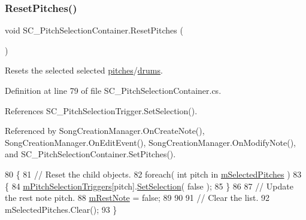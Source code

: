 \subsubsection{\texorpdfstring{Reset\+Pitches()}{ResetPitches()}}
{\footnotesize\ttfamily void S\+C\+\_\+\+Pitch\+Selection\+Container.\+Reset\+Pitches (\begin{DoxyParamCaption}{ }\end{DoxyParamCaption})}



Resets the selected selected \hyperlink{group___music_enums_ga508f69b199ea518f935486c990edac1d}{pitches}/\hyperlink{group___music_enums_gade475b4382c7066d1af13e7c13c029b6}{drums}. 



Definition at line 79 of file S\+C\+\_\+\+Pitch\+Selection\+Container.\+cs.



References S\+C\+\_\+\+Pitch\+Selection\+Trigger.\+Set\+Selection().



Referenced by Song\+Creation\+Manager.\+On\+Create\+Note(), Song\+Creation\+Manager.\+On\+Edit\+Event(), Song\+Creation\+Manager.\+On\+Modify\+Note(), and S\+C\+\_\+\+Pitch\+Selection\+Container.\+Set\+Pitches().


\begin{DoxyCode}
80     \{
81         \textcolor{comment}{// Reset the child objects.}
82         \textcolor{keywordflow}{foreach}( \textcolor{keywordtype}{int} pitch \textcolor{keywordflow}{in} \hyperlink{group___s_c___p_s_c_priv_var_ga5a8a5c31158f6af7f0c17d4fd03c5641}{mSelectedPitches} )
83         \{
84             \hyperlink{group___s_c___p_s_c_priv_var_ga8431846d376b98bc6de5a872cce2c596}{mPitchSelectionTriggers}[pitch].\hyperlink{group___s_c___p_s_t_pub_func_ga267db9aed38ba33ad44c26c84a1757df}{SetSelection}( \textcolor{keyword}{false} );
85         \}
86 
87         \textcolor{comment}{// Update the rest note pitch.}
88         \hyperlink{group___s_c___p_s_c_priv_var_ga6eec175f775c35e2d0eb51dfe6def49f}{mRestNote} = \textcolor{keyword}{false};
89 
90 
91         \textcolor{comment}{// Clear the list.}
92         mSelectedPitches.Clear();
93     \}
\end{DoxyCode}
\mbox{\label{group___s_c___p_s_c_pub_func_ga0b85aab924084ebb49be4f64ad6f81e5}} 
